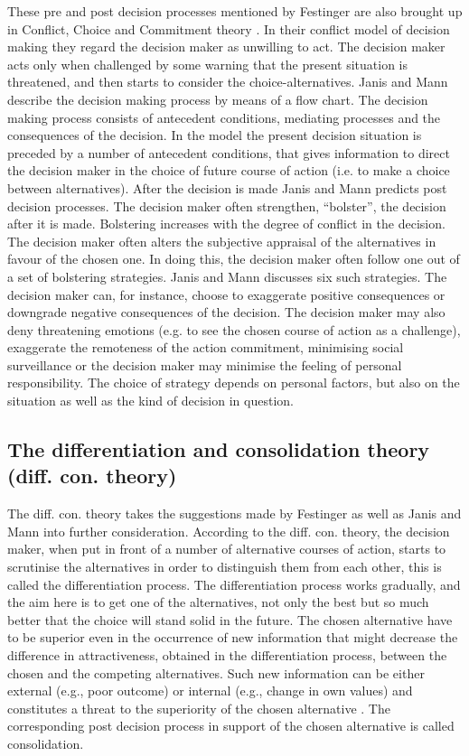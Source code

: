 \documentclass[jou,11pt]{apa6}
\begin{document}
These pre and post decision processes mentioned by Festinger
\parencite{festinger64} are also brought up in Conflict, Choice and
Commitment theory \parencite{JanisMann77}.  In their conflict model of
decision making they regard the decision maker as unwilling to act.
The decision maker acts only when challenged by some warning that the
present situation is threatened, and then starts to consider the
choice-alternatives.  Janis and Mann describe the decision making
process by means of a flow chart.  The decision making process
consists of antecedent conditions, mediating processes and the
consequences of the decision.  In the model the present decision
situation is preceded by a number of antecedent conditions, that gives
information to direct the decision maker in the choice of future
course of action (i.e.  to make a choice between alternatives).  After
the decision is made Janis and Mann predicts post decision processes.
The decision maker often strengthen, ``bolster'', the decision after it
is made.  Bolstering increases with the degree of conflict in the
decision.  The decision maker often alters the subjective appraisal of
the alternatives in favour of the chosen one.  In doing this, the
decision maker often follow one out of a set of bolstering strategies.
Janis and Mann discusses six such strategies.  The decision maker can,
for instance, choose to exaggerate positive consequences or downgrade
negative consequences of the decision.  The decision maker may also
deny threatening emotions (e.g. to see the chosen course of action as
a challenge), exaggerate the remoteness of the action commitment,
minimising social surveillance or the decision maker may minimise the
feeling of personal responsibility.  The choice of strategy depends on
personal factors, but also on the situation as well as the kind of
decision in question.

\subsection{The differentiation and consolidation theory
  (diff. con. theory)}

The diff. con. theory \parencite{svensson92b, Svensson95} takes the
suggestions made by Festinger \parencite{festinger64} as well as Janis
and Mann \parencite{JanisMann77} into further consideration.  According to the
diff. con. theory, the decision maker, when put in front of a number
of alternative courses of action, starts to scrutinise the
alternatives in order to distinguish them from each other, this is
called the differentiation process.  The differentiation process works
gradually, and the aim here is to get one of the alternatives, not
only the best but so much better that the choice will stand solid in
the future. The chosen alternative have to be superior even in the
occurrence of new information that might decrease the difference in
attractiveness, obtained in the differentiation process,  between the
chosen and the competing alternatives.  Such new information can be
either external (e.g., poor outcome) or internal (e.g., change in own
values) and constitutes a threat to the superiority of the chosen
alternative \parencite{svensson92a}.  The corresponding post decision
process in support of the chosen alternative is called consolidation.
\end{document}
